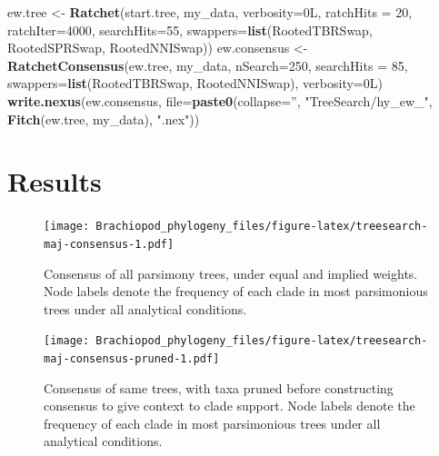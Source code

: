 \documentclass[openany]{book}
\newenvironment{Shaded}{\begin{snugshade}}{\end{snugshade}}
\newcommand{\KeywordTok}[1]{\textcolor[rgb]{0.13,0.29,0.53}{\textbf{#1}}}
\newcommand{\DataTypeTok}[1]{\textcolor[rgb]{0.13,0.29,0.53}{#1}}
\newcommand{\DecValTok}[1]{\textcolor[rgb]{0.00,0.00,0.81}{#1}}
\newcommand{\StringTok}[1]{\textcolor[rgb]{0.31,0.60,0.02}{#1}}
\newcommand{\NormalTok}[1]{#1}
\begin{document}
\begin{Shaded}
\begin{Highlighting}[]
\NormalTok{ew.tree <-}\StringTok{ }\KeywordTok{Ratchet}\NormalTok{(start.tree, my_data, }\DataTypeTok{verbosity=}\NormalTok{0L,}
                   \DataTypeTok{ratchHits =} \DecValTok{20}\NormalTok{, }\DataTypeTok{ratchIter=}\DecValTok{4000}\NormalTok{, }\DataTypeTok{searchHits=}\DecValTok{55}\NormalTok{,}
                   \DataTypeTok{swappers=}\KeywordTok{list}\NormalTok{(RootedTBRSwap, RootedSPRSwap, RootedNNISwap))}
\NormalTok{ew.consensus <-}\StringTok{ }\KeywordTok{RatchetConsensus}\NormalTok{(ew.tree, my_data, }\DataTypeTok{nSearch=}\DecValTok{250}\NormalTok{, }\DataTypeTok{searchHits =} \DecValTok{85}\NormalTok{,}
                                 \DataTypeTok{swappers=}\KeywordTok{list}\NormalTok{(RootedTBRSwap, RootedNNISwap),}
                                 \DataTypeTok{verbosity=}\NormalTok{0L)}
\KeywordTok{write.nexus}\NormalTok{(ew.consensus, }\DataTypeTok{file=}\KeywordTok{paste0}\NormalTok{(}\DataTypeTok{collapse=}\StringTok{''}\NormalTok{, }\StringTok{"TreeSearch/hy_ew_"}\NormalTok{,}
                                      \KeywordTok{Fitch}\NormalTok{(ew.tree, my_data), }\StringTok{".nex"}\NormalTok{))}
\end{Highlighting}
\end{Shaded}

\section{Results}\label{results-1}







\begin{figure}
\centering
\texttt{[image: Brachiopod\_phylogeny\_files/figure-latex/treesearch-maj-consensus-1.pdf]}
\caption{\label{fig:treesearch-maj-consensus}Consensus of all parsimony trees, under equal and
implied weights.
Node labels denote the frequency of each clade in
most parsimonious trees under all analytical conditions.}
\end{figure}




\begin{figure}
\centering
\texttt{[image: Brachiopod\_phylogeny\_files/figure-latex/treesearch-maj-consensus-pruned-1.pdf]}
\caption{\label{fig:treesearch-maj-consensus-pruned}Consensus of same trees, with taxa pruned before
constructing consensus to give context to clade support.
Node labels denote the frequency of each clade in
most parsimonious trees under all analytical conditions.}
\end{figure}
\end{document}
